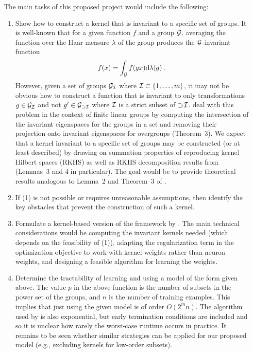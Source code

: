 The main tasks of this proposed project would include the following:
\begin{enumerate}

\item
Show how to construct a kernel that is invariant to a specific set of groups. It is well-known that for a given function $f$ and a group $\mathcal{G}$, averaging the function over the Haar measure $\lambda$ of the group produces the $\mathcal{G}$-invariant function
\[
\bar{f}(x) = \int_{\mathcal{G}} f(gx)\mathrm{d}\lambda(g)\;.
\]
However, given a set of groups $\mathcal{G}_{\mathcal{I}}$ where $\mathcal{I}\subset\{1,\ldots,m\}$, it may not be obvious how to construct a function that is invariant to only transformations $g\in\mathcal{G}_{\mathcal{I}}$ and not $g'\in\mathcal{G}_{\supset\mathcal{I}}$ where $\mathcal{I}$ is a strict subset of $\supset\!\mathcal{I}$. \textcite{Mouli:2021} deal with this problem in the context of finite linear groups by computing the intersection of the invariant eigenspaces for the groups in a set and removing their projection onto invariant eigenspaces for overgroups (Theorem~3). We expect that a kernel invariant to a specific set of groups may be constructed (or at least described) by drawing on summation properties of reproducing kernel Hilbert spaces (RKHS) as well as RKHS decomposition results from \parencite{Elesedy:2021} (Lemmas~3 and 4 in particular). The goal would be to provide theoretical results analogous to Lemma~2 and Theorem~3 of \parencite{Mouli:2021}.

\item
If (1) is not possible or requires unreasonable assumptions, then identify the key obstacles that prevent the construction of such a kernel.

\item
Formulate a kernel-based version of the framework by \citeauthor{Mouli:2021}. The main technical considerations would be computing the invariant kernels needed (which depends on the feasibility of (1)), adapting the regularization term in the optimization objective to work with kernel weights rather than neuron weights, and designing a feasible algorithm for learning the weights.

\item
Determine the tractability of learning and using a model of the form given above. The value $p$ in the above function is the number of subsets in the power set of the groups, and $n$ is the number of training examples. This implies that just using the given model is of order $O(2^mn)$. The algorithm used by \textcite{Mouli:2021} is also exponential, but early termination conditions are included and so it is unclear how rarely the worst-case runtime occurs in practice. It remains to be seen whether similar strategies can be applied for our proposed model (e.g., excluding kernels for low-order subsets).

\end{enumerate}

